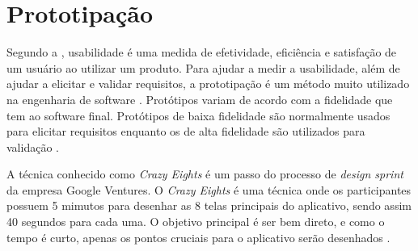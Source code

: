 \section{Prototipação}

Segundo a , usabilidade é uma medida de efetividade, eficiência e satisfação de um usuário ao utilizar um produto. Para ajudar a medir a usabilidade, além de ajudar a elicitar e validar requisitos, a prototipação é um método muito utilizado na engenharia de software \cite{sommerville}.
Protótipos variam de acordo com a fidelidade que tem ao software final. Protótipos de baixa fidelidade são normalmente usados para elicitar requisitos enquanto os de alta fidelidade são utilizados para validação \cite{prototipacao}.

A técnica conhecido como \textit{Crazy Eights} é um passo do processo de \textit{design sprint} da empresa Google Ventures. O \textit{Crazy Eights} é uma técnica onde os participantes possuem 5 mimutos para desenhar as 8 telas principais do aplicativo, sendo assim 40 segundos para cada uma. O objetivo principal é ser bem direto, e como o tempo é curto, apenas os pontos cruciais para o aplicativo serão desenhados \cite{knapp}.
